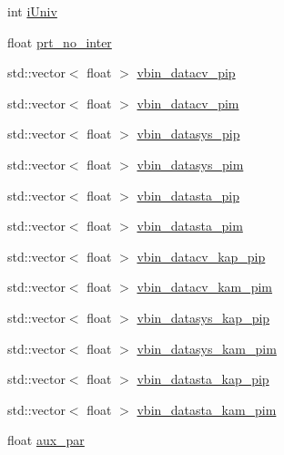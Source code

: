 \begin{DoxyCompactItemize}
\item 
int \hyperlink{class_neutrino_flux_reweight_1_1_m_i_p_p_numi_kaon_yields_reweighter_a22da7248cf883c4d01c486e6763dd3bc}{i\-Univ}
\item 
float \hyperlink{class_neutrino_flux_reweight_1_1_m_i_p_p_numi_kaon_yields_reweighter_ad0e1b0e610a8d647d0be6d97e80327fa}{prt\-\_\-no\-\_\-inter}
\item 
std\-::vector$<$ float $>$ \hyperlink{class_neutrino_flux_reweight_1_1_m_i_p_p_numi_kaon_yields_reweighter_a826bd079aef8a6915cea2dd8ccf03589}{vbin\-\_\-datacv\-\_\-pip}
\item 
std\-::vector$<$ float $>$ \hyperlink{class_neutrino_flux_reweight_1_1_m_i_p_p_numi_kaon_yields_reweighter_a5c434b561304af4dd8d0a5145b07b62e}{vbin\-\_\-datacv\-\_\-pim}
\item 
std\-::vector$<$ float $>$ \hyperlink{class_neutrino_flux_reweight_1_1_m_i_p_p_numi_kaon_yields_reweighter_a852ed8a2467fade867ca8abe0d0b3037}{vbin\-\_\-datasys\-\_\-pip}
\item 
std\-::vector$<$ float $>$ \hyperlink{class_neutrino_flux_reweight_1_1_m_i_p_p_numi_kaon_yields_reweighter_a1c50c5dbfbf3688e4034dead330d83db}{vbin\-\_\-datasys\-\_\-pim}
\item 
std\-::vector$<$ float $>$ \hyperlink{class_neutrino_flux_reweight_1_1_m_i_p_p_numi_kaon_yields_reweighter_a258a6c0170a0ba06b44fad43b7dcff2f}{vbin\-\_\-datasta\-\_\-pip}
\item 
std\-::vector$<$ float $>$ \hyperlink{class_neutrino_flux_reweight_1_1_m_i_p_p_numi_kaon_yields_reweighter_aada860b3db9a168dcfda7a2df361591e}{vbin\-\_\-datasta\-\_\-pim}
\item 
std\-::vector$<$ float $>$ \hyperlink{class_neutrino_flux_reweight_1_1_m_i_p_p_numi_kaon_yields_reweighter_a1d8321111a686ae97238fb98ed7c1a1b}{vbin\-\_\-datacv\-\_\-kap\-\_\-pip}
\item 
std\-::vector$<$ float $>$ \hyperlink{class_neutrino_flux_reweight_1_1_m_i_p_p_numi_kaon_yields_reweighter_a862186e4424a3514fc7441fc40bb2be3}{vbin\-\_\-datacv\-\_\-kam\-\_\-pim}
\item 
std\-::vector$<$ float $>$ \hyperlink{class_neutrino_flux_reweight_1_1_m_i_p_p_numi_kaon_yields_reweighter_a7a026f18f2ee99ed16e5dd2bdb5c96af}{vbin\-\_\-datasys\-\_\-kap\-\_\-pip}
\item 
std\-::vector$<$ float $>$ \hyperlink{class_neutrino_flux_reweight_1_1_m_i_p_p_numi_kaon_yields_reweighter_a26e3d74e529b8d9f359b1f6501665178}{vbin\-\_\-datasys\-\_\-kam\-\_\-pim}
\item 
std\-::vector$<$ float $>$ \hyperlink{class_neutrino_flux_reweight_1_1_m_i_p_p_numi_kaon_yields_reweighter_a014b0274aeb81973cc0579c218709031}{vbin\-\_\-datasta\-\_\-kap\-\_\-pip}
\item 
std\-::vector$<$ float $>$ \hyperlink{class_neutrino_flux_reweight_1_1_m_i_p_p_numi_kaon_yields_reweighter_adbfd90fe79b72cba9a772bb563f7e4fa}{vbin\-\_\-datasta\-\_\-kam\-\_\-pim}
\item 
float \hyperlink{class_neutrino_flux_reweight_1_1_m_i_p_p_numi_kaon_yields_reweighter_a834bede67f164f8a08d50bd15f8ef02c}{aux\-\_\-par}
\end{DoxyCompactItemize}


